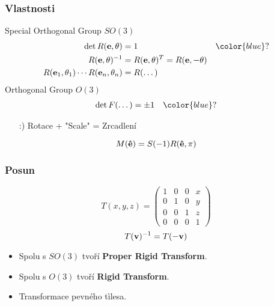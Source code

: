 \begin{frame}
    \frametitle{Vlastnosti}
    Special Orthogonal Group $SO(3)$
    \begin{align*}
        \det R(\V{e}, \theta) &= 1 & {\color{blue}?} \\
        R(\V{e}, \theta)^{-1} &= R(\V{e}, \theta)^T = R(\V{e}, -\theta) \\
        R(\V{e}_1,\theta_1)\dotsm R(\V{e}_n,\theta_n) &= R(\dotso)
    \end{align*}
    \pause\vfill
    Orthogonal Group $O(3)$
    \begin{align*}
        \det F(\dotso) &= \pm1 & {\color{blue}?}
    \end{align*}
    \pause\vfill
    \begin{itemize}
        \item[\color{green}:)] Rotace + "Scale" = Zrcadlení
    \end{itemize}
    \begin{equation*}
        M(\mathbf{\hat{e}}) = S(-1)R(\mathbf{\hat{e}}, \pi)
    \end{equation*}
\end{frame}

\begin{frame}
    \frametitle{Posun}
    \begin{equation*}
        T(x,y,z) = \begin{pmatrix}
            1&0&0&x\\0&1&0&y\\0&0&1&z\\0&0&0&1
        \end{pmatrix}
    \end{equation*}
    \vfill
    \begin{equation*}
        T(\mathbf{v})^{-1} = T(-\mathbf{v})
    \end{equation*}
    \vfill
    \begin{itemize}
        \item Spolu s $SO(3)$ tvoří \textbf{Proper Rigid Transform}.
        \item Spolu s $O(3)$ tvoří \textbf{Rigid Transform}.
        \item Transformace pevného tìlesa.
    \end{itemize}
\end{frame}


